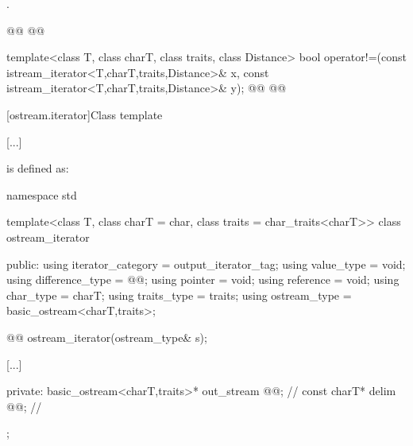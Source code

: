 \begin{itemdescr}
\pnum
\returns
{}.
\end{itemdescr}

\begin{addedblock}
{\color{newclr}
%
\begin{itemdecl}
@@
@@
\end{itemdecl}

\begin{itemdescr}
\pnum
\newtxt{\returns
}
\end{itemdescr}
} %
\end{addedblock}

%
\begin{itemdecl}
template<class T, class charT, class traits, class Distance>
  bool operator!=(const istream_iterator<T,charT,traits,Distance>& x,
                  const istream_iterator<T,charT,traits,Distance>& y);
@@
@@
\end{itemdecl}

\begin{itemdescr}
\pnum
\returns
{}
\end{itemdescr}

[ostream.iterator]{Class template }

[...]

\setcounter{Paras}{1}
\pnum {} is defined as:

\begin{codeblock}
namespace std {
  template<class T, class charT = char, class traits = char_traits<charT>>
  class ostream_iterator {
  public:
    using iterator_category = output_iterator_tag;
    using value_type        = void;
    using difference_type   = @@;
    using pointer           = void;
    using reference         = void;
    using char_type         = charT;
    using traits_type       = traits;
    using ostream_type      = basic_ostream<charT,traits>;

    @@
    ostream_iterator(ostream_type& s);

    [...]

  private:
    basic_ostream<charT,traits>* out_stream @@;  // \expos
    const charT* delim @@;                       // \expos
  };
}
\end{codeblock}

